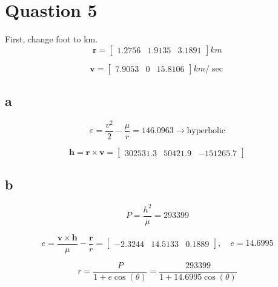\section{Quastion 5}
First, change foot to km.
$$
\boldsymbol r = \begin{bmatrix}
    1.2756  &  1.9135  &  3.1891
\end{bmatrix} km
$$

$$
\boldsymbol v = \begin{bmatrix}
    7.9053     &    0  & 15.8106
\end{bmatrix} km/\sec
$$
\subsection{a}
$$
\varepsilon = \dfrac{v^2}{2} - \dfrac{\mu}{r} = 146.0963 \to \text{hyperbolic}
$$

$$
\boldsymbol h = \boldsymbol r \times \boldsymbol v  = \begin{bmatrix}
    302531.3 & 50421.9 & -151265.7
\end{bmatrix}
$$

\subsection{b}

$$
P = \dfrac{h^2}{\mu} = 293399
$$


$$
e = \dfrac{\boldsymbol v \times \boldsymbol h}{\mu} - \dfrac{\boldsymbol r}{r} = \begin{bmatrix}
    -2.3244 &  14.5133  &  0.1889
\end{bmatrix}, \quad e = 14.6995
$$

$$
r = \dfrac{P}{1+e\cos(\theta)} = \dfrac{293399}{1 + 14.6995 \cos(\theta)}
$$


